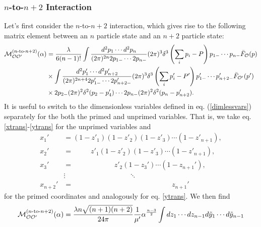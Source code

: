 \begin{subappendices}
\subsubsection{$n$-to-$n+2$ Interaction} 
Let's first consider the $n$-to-$n+2$ interaction, which gives rise to the 
following matrix element between an $n$ particle state and an $n+2$ particle 
state: 
\begin{equation}
    \begin{aligned}
        {\cal M}^{(n\textrm{-to-}n+2)}_{{\cal O} {\cal O}'}(\alpha) &= \frac{\lambda}{6(n-1)!} \int \frac{d^2 p_1 \dotsb d^2 p_n}{(2\pi)^{2n} 2p_{1-} \dotsb 2p_{n-}} (2\pi)^3 \delta^3 \left(\sum_i p_i - P \right) p_{1-} \dotsb p_{n-} \bar{F}_{{\cal O}}(p) \\
        &\times \int \frac{d^2p_1' \dotsb d^2p_{n+2}'}{(2\pi)^{2n+4} 2p_{1-}' \dotsb 2p'_{n+2-}} (2\pi)^3 \delta^3\left(\sum_i p'_i - P' \right) p'_{1-} \dotsb p'_{n+2-} \bar{F}_{{\cal O}'}(p') \\
        &\times 2p_{2-} (2\pi)^2 \delta^2(p_2 - p'_4) \dotsb 2 p_{n-} (2\pi)^2 \delta^2 (p_n - p'_{n+2}).
    \end{aligned}
\end{equation} 
It is useful to switch to the dimensionless variables defined in eq. 
(\ref{dimlessvars}) separately for the both the primed and unprimed variables. 
That is, we take eq. \eqref{xtrans}-\eqref{ytrans} for the unprimed variables 
and 
\begin{equation}
    \begin{aligned}
        x_1' &= (1-z'_1)(1-z'_2)(1-z'_3) \dotsb (1-z'_{n+1}), \\
        x_2' &= \quad\quad\,\,\, z'_1(1-z'_2)(1-z'_3) \dotsb (1-z'_{n+1}), \\
        x_3' &= \quad\quad\,\,\, \quad\quad\quad\,\, z'_2(1-z_3') \dotsb (1-z_{n+1}'), \\
        &\vdots \quad\quad\quad\quad\quad\quad\quad\quad\quad \ddots \\
        x_{n+2}' &= \quad\quad\quad\quad\quad\quad\quad\quad\quad\quad\quad\quad\quad\quad z_{n+1}' \label{xtransprimed}
    \end{aligned}
\end{equation} 
for the primed coordinates and analogously for eq. \eqref{ytrans}. We then find 
\begin{equation}
    \begin{aligned}
        &\Mcal^{(n\textrm{-to-}n+2)}_{\Ocal \Ocal'}(\alpha) = \frac{\lambda n \sqrt{(n+1)(n+2)}}{24 \pi} \frac{1}{\mu'} \alpha^{\frac{n-3}{2}} \int dz_1 \dotsb dz_{n-1}   d\tilde{y}_1 \dotsb d\tilde{y}_{n-1}  \\

\end{aligned}
\end{equation}
\end{subappendices}
